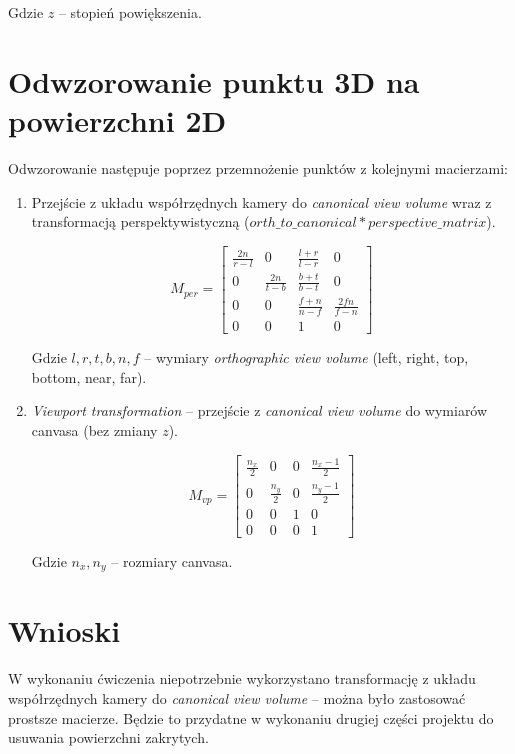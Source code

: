 \documentclass{article}
\begin{document}
        Gdzie \(z\) -- stopień powiększenia.

\newpage

\section{Odwzorowanie punktu 3D na powierzchni 2D}

    Odwzorowanie następuje poprzez przemnożenie punktów z kolejnymi macierzami:

    \begin{enumerate}

        \item Przejście z układu współrzędnych kamery do \textit{canonical view volume} wraz 
        z transformacją perspektywistyczną (\(orth\_to\_canonical * perspective\_matrix\)).

        \begin{equation}
            M_{per}=
            \begin{bmatrix}
                \frac{2n}{r-l} & 0 & \frac{l+r}{l-r} & 0 \\
                0 & \frac{2n}{t-b} & \frac{b+t}{b-t} & 0 \\
                0 & 0 & \frac{f+n}{n-f} & \frac{2fn}{f-n} \\
                0 & 0 & 1 & 0
            \end{bmatrix}
        \end{equation}

        Gdzie \(l, r, t, b, n, f\) -- wymiary \textit{orthographic view volume} (left, right,
        top, bottom, near, far).

        \item \textit{Viewport transformation} -- przejście z \textit{canonical view volume}
        do wymiarów canvasa (bez zmiany \(z\)).

        \begin{equation}
            M_{vp}=
            \begin{bmatrix}
                \frac{n_x}{2} & 0 & 0 & \frac{n_x-1}{2} \\
                0 & \frac{n_y}{2} & 0 & \frac{n_y-1}{2} \\
                0 & 0 & 1 & 0 \\
                0 & 0 & 0 & 1
            \end{bmatrix}
        \end{equation}

        Gdzie \(n_x, n_y\) -- rozmiary canvasa.

    \end{enumerate}

\section{Wnioski}

    W wykonaniu ćwiczenia niepotrzebnie wykorzystano transformację z układu współrzędnych
    kamery do \textit{canonical view volume} -- można było zastosować prostsze macierze. 
    Będzie to przydatne w wykonaniu drugiej części projektu do usuwania powierzchni zakrytych.
 
\end{document}
